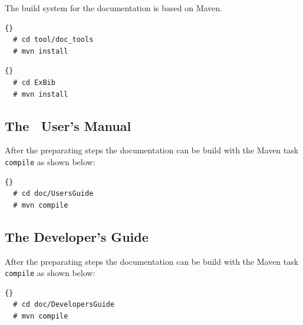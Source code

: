 The build system for the documentation is based on Maven.

\INCOMPLETE

\begin{lstlisting}{}
  # cd tool/doc_tools
  # mvn install
\end{lstlisting}

\INCOMPLETE

\begin{lstlisting}{}
  # cd ExBib
  # mvn install
\end{lstlisting}


\subsection{The \ExTeX\ User's Manual}

After the preparating steps the documentation can be build with the
Maven task \texttt{compile} as shown below:

\begin{lstlisting}{}
  # cd doc/UsersGuide
  # mvn compile
\end{lstlisting}

\subsection{The Developer's Guide}

After the preparating steps the documentation can be build with the
Maven task \texttt{compile} as shown below:

\begin{lstlisting}{}
  # cd doc/DevelopersGuide
  # mvn compile
\end{lstlisting}
